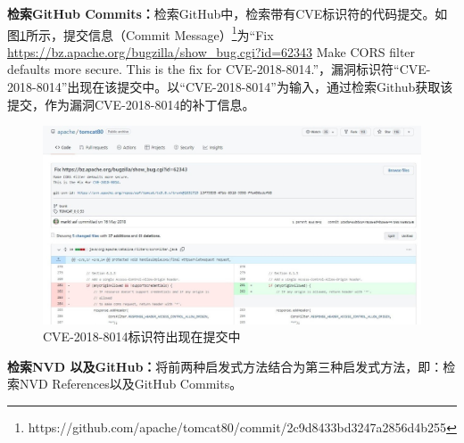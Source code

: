 \textbf{检索GitHub Commits：}检索GitHub中，检索带有CVE标识符的代码提交\cite{you2017semfuzz,Wang2020empirical}。如图\ref{fig:commitmessage}所示，提交信息（Commit Message）\footnote{https://github.com/apache/tomcat80/commit/2c9d8433bd3247a2856d4b255}为“Fix \url{https://bz.apache.org/bugzilla/show_bug.cgi?id=62343} Make CORS filter defaults more secure. This is the fix for CVE-2018-8014.”，漏洞标识符“CVE-2018-8014”出现在该提交中。以“CVE-2018-8014”为输入，通过检索Github获取该提交，作为漏洞CVE-2018-8014的补丁信息。
\begin{figure}[h]
    \centering
    \includegraphics[scale=0.45]{fig/CVE in commit message.jpg}
    \caption{CVE-2018-8014标识符出现在提交中}\label{fig:commitmessage}
\end{figure}

\textbf{检索NVD 以及GitHub：}将前两种启发式方法结合为第三种启发式方法，即：检索NVD References以及GitHub Commits。

